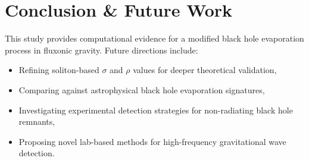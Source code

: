 \documentclass{article}
\begin{document}
\section{Conclusion \& Future Work}
This study provides computational evidence for a modified black hole evaporation process in fluxonic gravity. Future directions include:
\begin{itemize}
    \item Refining soliton-based $\sigma$ and $\rho$ values for deeper theoretical validation,
    \item Comparing against astrophysical black hole evaporation signatures,
    \item Investigating experimental detection strategies for non-radiating black hole remnants,
    \item Proposing novel lab-based methods for high-frequency gravitational wave detection.
\end{itemize}
\end{document}
